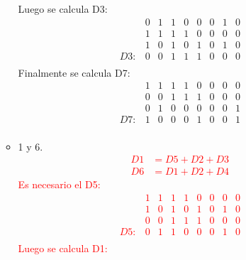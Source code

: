 \documentclass{templateNote}
\begin{document}
\begin{itemize}
\begin{itemize}
{            Luego se calcula D3:
            \begin{equation*}
                \begin{array}{ccccccccc}
                    & 0 & 1 & 1 & 0 & 0 & 0 & 1 & 0 \\
                    & 1 & 1 & 1 & 1 & 0 & 0 & 0 & 0 \\
                    & 1 & 0 & 1 & 0 & 1 & 0 & 1 & 0 \\ \hline
                D3: & 0 & 0 & 1 & 1 & 1 & 0 & 0 & 0 \\
                \end{array}
            \end{equation*}
            Finalmente se calcula D7:
            \begin{equation*}
                \begin{array}{ccccccccc}
                    & 1 & 1 & 1 & 1 & 0 & 0 & 0 & 0 \\
                    & 0 & 0 & 1 & 1 & 1 & 0 & 0 & 0 \\
                    & 0 & 1 & 0 & 0 & 0 & 0 & 0 & 1 \\ \hline
                D7: & 1 & 0 & 0 & 0 & 1 & 0 & 0 & 1 \\
                \end{array}
            \end{equation*}
        }
        \item 1 y 6.
        \textcolor{red}{
            \begin{align*}
                D1 &= D5 + D2 + D3 \\
                D6 &= D1 + D2 + D4
            \end{align*}
            Es necesario el D5:
            \begin{equation*}
                \begin{array}{ccccccccc}
                    & 1 & 1 & 1 & 1 & 0 & 0 & 0 & 0 \\
                    & 1 & 0 & 1 & 0 & 1 & 0 & 1 & 0 \\
                    & 0 & 0 & 1 & 1 & 1 & 0 & 0 & 0 \\ \hline
                D5: & 0 & 1 & 1 & 0 & 0 & 0 & 1 & 0 \\
                \end{array}
            \end{equation*}
            Luego se calcula D1:
            \begin{equation*}
                \begin{array}{ccccccccc}

\end{array}
\end{equation*}}
\end{itemize}
\end{itemize}
\end{document}
